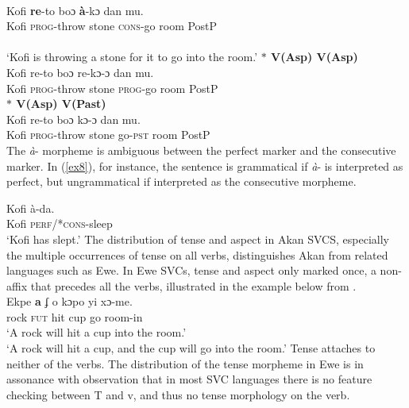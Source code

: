 \documentclass[output=paper,colorlinks,citecolor=brown]{langscibook}
\begin{document}
\ea\label{ex4} 
 \\
\gll Kofi \textbf{re}-to boɔ \textbf{\`a}-kɔ dan mu.\\
	Kofi \textsc{prog}-throw stone \textsc{cons}-go room  PostP\\
	 \\
\glt `Kofi is throwing a stone for it to go into the room.'
\z 
\ex\label{ex05}
\textbf{$\ast$ \phantom {} {} {}  V(Asp)\phantom {} {} {}   V(Asp)} 
     \ea\label{ex07} 
 \\
\gll * Kofi re-to boɔ re-kɔ-ɔ dan mu.\\
	{} Kofi \textsc{prog}-throw  stone  \textsc{prog}-go room PostP\\
\z 
\ex\label{ex005}
\textbf{$\ast$ \phantom {} {} {}  V(Asp)\phantom {} {} {}   V(Past)} 
     \ea\label{ex7} 
 \\
\gll * Kofi re-to boɔ kɔ-ɔ dan mu.\\
	{} Kofi \textsc{prog}-throw  stone  go-\textsc{pst} room PostP\\
\z 
\z \z 
The \emph{\`a}- morpheme is ambiguous between the perfect marker and the consecutive marker. In (\ref{ex8}), for instance, the sentence is grammatical if \emph{\`a}- is interpreted as perfect, but ungrammatical if interpreted as the consecutive morpheme.

\ea \label{ex8}
 \gll Kofi \`a-da.\\
	Kofi \textsc{perf}/*\textsc{cons}-sleep\\
	\glt `Kofi has slept.'
\z The distribution of tense and aspect in Akan SVCS, especially the multiple occurrences of tense on all verbs, distinguishes Akan from related languages such as Ewe. In Ewe SVCs, tense and aspect only marked once, a non-affix that precedes all the verbs, illustrated in the example below from \cite{Collins1997}.
\ea \label{ex0)} 
 \\
\gll Ekpe \textbf{a} ʄ o kɔpo yi xɔ-me.\\
rock {\textsc{fut}} hit cup go room-in\\
\glt `A rock will hit a cup into the room.'\\
`A rock will hit a cup, and the cup will go into the room.' 
\z Tense attaches to neither of the verbs. The distribution of the tense morpheme in Ewe is in assonance with  observation that in most SVC languages there is no feature checking between T and v, and thus no tense morphology on the verb.
\end{document}
